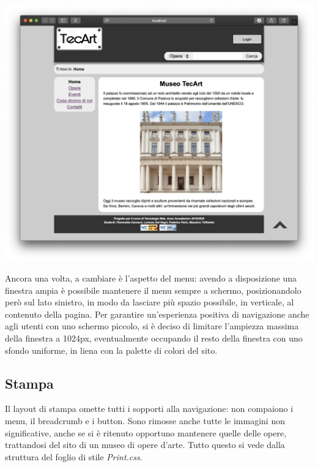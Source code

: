 \begin{center}
	\includegraphics[width=\textwidth]{img/Desktop-pres}
\end{center}
Ancora una volta, a cambiare è l'aspetto del menu: avendo a disposizione una finestra ampia è possibile mantenere il menu sempre a schermo, posizionandolo però sul lato sinistro, in modo da lasciare più spazio possibile, in verticale, al contenuto della pagina. Per garantire un'esperienza positiva di navigazione anche agli utenti con uno schermo piccolo, si è deciso di limitare l'ampiezza massima della finestra a 1024px, eventualmente occupando il resto della finestra con uno sfondo uniforme, in liena con la palette di colori del sito.


\subsection{Stampa}
\label{presentazione-stampa}


Il layout di stampa omette tutti i sopporti alla navigazione: non compaiono i menu, il breadcrumb e i button. Sono rimosse anche tutte le immagini non significative, anche se si è ritenuto opportuno mantenere quelle delle opere, trattandosi del sito di un museo di opere d'arte. Tutto questo si vede dalla struttura del foglio di stile \textit{Print.css}.
